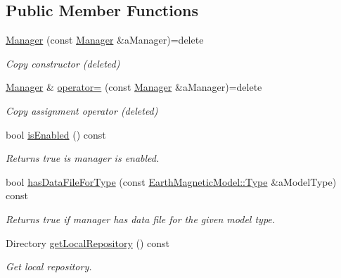 \subsection*{Public Member Functions}
\begin{DoxyCompactItemize}
\item 
\hyperlink{classostk_1_1physics_1_1environment_1_1magnetic_1_1earth_1_1_manager_a92c4248dd976fec3ab048a07a7265f9c}{Manager} (const \hyperlink{classostk_1_1physics_1_1environment_1_1magnetic_1_1earth_1_1_manager}{Manager} \&a\+Manager)=delete
\begin{DoxyCompactList}\small\item\em Copy constructor (deleted) \end{DoxyCompactList}\item 
\hyperlink{classostk_1_1physics_1_1environment_1_1magnetic_1_1earth_1_1_manager}{Manager} \& \hyperlink{classostk_1_1physics_1_1environment_1_1magnetic_1_1earth_1_1_manager_a1f3acc969ac17edb717742281f2e761a}{operator=} (const \hyperlink{classostk_1_1physics_1_1environment_1_1magnetic_1_1earth_1_1_manager}{Manager} \&a\+Manager)=delete
\begin{DoxyCompactList}\small\item\em Copy assignment operator (deleted) \end{DoxyCompactList}\item 
bool \hyperlink{classostk_1_1physics_1_1environment_1_1magnetic_1_1earth_1_1_manager_a8c18727649d0ab23d754a7f262b50852}{is\+Enabled} () const
\begin{DoxyCompactList}\small\item\em Returns true is manager is enabled. \end{DoxyCompactList}\item 
bool \hyperlink{classostk_1_1physics_1_1environment_1_1magnetic_1_1earth_1_1_manager_a0d7311ec16369f14d064143343ceb1f1}{has\+Data\+File\+For\+Type} (const \hyperlink{classostk_1_1physics_1_1environment_1_1magnetic_1_1_earth_a30a064d87b6fce338e76aebd3043b6b6}{Earth\+Magnetic\+Model\+::\+Type} \&a\+Model\+Type) const
\begin{DoxyCompactList}\small\item\em Returns true if manager has data file for the given model type. \end{DoxyCompactList}\item 
Directory \hyperlink{classostk_1_1physics_1_1environment_1_1magnetic_1_1earth_1_1_manager_aa3181b328abeb45f518f78b682f83d04}{get\+Local\+Repository} () const
\begin{DoxyCompactList}\small\item\em Get local repository. \end{DoxyCompactList}\item 

\end{DoxyCompactItemize}
